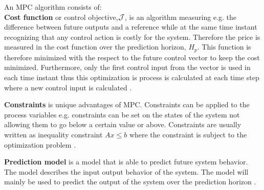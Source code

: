 An MPC algorithm consists of:
\\ 
\textbf{Cost function} or control objective,$\CMcal{J}$, is an algorithm measuring e.g. the difference between future outputs and a reference while at the same time instant recognizing that any control action is costly for the system. Therefore the price is measured in the cost function over the prediction horizon, $H_p$. This function is therefore minimized with the respect to the future control vector to keep the cost minimized. Furthermore, only the first control input from the vector is used in each time instant thus this optimization is process is calculated at each time step where a new control input is calculated \cite{mpc_control_lecture_notes}.

\textbf{Constraints} is unique advantages of MPC. Constraints can be applied to the process variables e.g. constraints can be set on the states of the system not allowing them to go below a certain value or above. Constraints are usually written as inequality constraint $Ax\leq b$ where the constraint is subject to the optimization problem \cite{mpc_control_lecture_notes}.   

\textbf{Prediction model} is a model that is able to predict future system behavior. The model describes the input output behavior of the system. The model will mainly be used to predict the output of the system over the prediction horizon \cite{mpc_control_lecture_notes}.  





